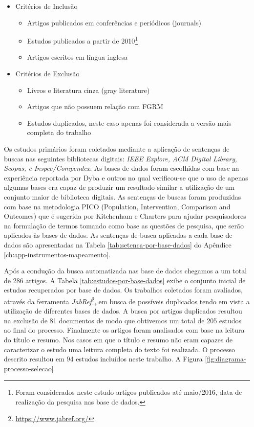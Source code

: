 \documentclass[msc]{ppgccufmg} %
\begin{document}
\begin{itemize}
	\item Critérios de Inclusão
		\begin{itemize}
			 \item Artigos publicados em conferências e periódicos (journals)
			 \item Estudos publicados a partir de 2010\footnote{Foram considerados neste estudo artigos publicados até maio/2016, data de realização da pesquisa nas base de dados.}
			 \item Artigos escritos em língua inglesa
		\end{itemize}
	\item Critérios de Exclusão
		\begin{itemize}
			\item Livros e literatura cinza (gray literature)
			\item Artigos que não possuem relação com FGRM
			\item Estudos duplicados, neste caso apenas foi considerada a versão mais completa do trabalho
		\end{itemize}
\end{itemize}

Os estudos primários foram coletados mediante a aplicação de sentenças de buscas nas seguintes bibliotecas digitais: \textit{IEEE Explore, ACM Digital Library, Scopus, e Inspec/Compendex}. As bases de dados foram escolhidas com base na experiência reportada por Dyba e outros \cite{dybaa2007applying}  no qual verificou-se que o uso de apenas algumas bases era capaz de produzir um resultado similar a utilização de um conjunto maior de biblioteca digitais. As sentenças de buscas foram produzidas com base na metodologia PICO (Population, Intervention, Comparison and Outcomes) que é sugerida por Kitchenham e Charters \cite{keele2007guidelines} para ajudar pesquisadores na formulação de termos tomando como base as questões de pesquisa, que serão aplicados às bases de dados. As sentenças de busca aplicadas a cada base de dados são apresentadas na Tabela \ref{tab:setenca-por-base-dados} do Apêndice \ref{ch:app-instrumentos-mapeamento}.


Após a condução da busca automatizada nas base de dados chegamos a um total de 286 artigos. A Tabela
\ref{tab:estudos-por-base-dados} exibe o conjunto inicial de estudos recuperados por base de dados.
Os trabalhos coletados foram avaliados, através da ferramenta
\textit{JabRef}\footnote{\url{https://www.jabref.org/}}, em busca de possíveis duplicados tendo em
vista a utilização de diferentes bases de dados. A busca por artigos duplicados resultou na exclusão
de 81 documentos de modo que obtivemos um total de 205 estudos ao final do processo. Finalmente os
artigos foram analisados com base na leitura do título e resumo. Nos casos em que o título e resumo
não eram capazes de caracterizar o estudo uma leitura completa do texto foi realizada. O processo
descrito resultou em 94 estudos incluídos neste trabalho. A Figura \ref{fig:diagrama-processo-selecao}
\end{document}
